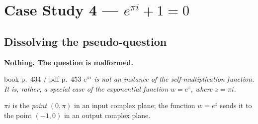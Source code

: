 \clearpage
\renewcommand{\sectioncolor}{csD}
\section{Case Study 4 — \texorpdfstring{$e^{\pi i}+1=0$}{e\^{}(pi i)+1=0}}
\noindent{}\;\;

\vspace{6pt}
\subsection{Dissolving the pseudo-question}

\begin{critbox}[title={``What does it mean to multiply $e$ by itself $\pi i$ times?''}]
\begin{center}\large\bfseries\color{crimson}
Nothing. The question is malformed.
\end{center}
\begin{bookquote}{book p.~434 / pdf p.~453}
\textit{$e^{\pi i}$ is not an instance of the self-multiplication function. It is, rather, a special
case of the exponential function $w=e^{z}$, where $z=\pi i$.}
\end{bookquote}
\end{critbox}

\noindent$\pi i$ is the \emph{point} $(0,\pi)$ in an input complex plane; the function $w=e^{z}$
sends it to the point $(-1,0)$ in an output complex plane.


